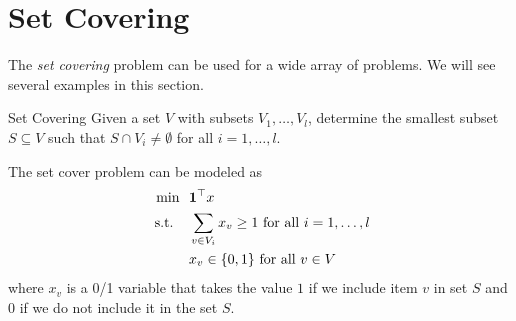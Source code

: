 \section{Set Covering}

The \emph{set covering} problem can be used for a wide array of problems.    We will see several examples in this section.

\begin{general}{Set Covering}{\npcomplete}
\label{general:set-covering}
Given a set $V$ with subsets $V_1, \dots, V_l$, determine the smallest subset $S \subseteq V$ such that 
$S \cap V_i \neq \emptyset$ for all $i=1, \dots, l$.

The set cover problem can be modeled as
\begin{equation}
\begin{split}
\min \ \ & \mathbf{1}^\top x\\
\text{ s.t. } \ \ & \sum_{v \in V_i} x_v \geq 1 \text{ for all } i =1, \dots, l \\ 
& x_v \in \{0,1\} \text{ for all } v \in V
\end{split}
\end{equation}
where $x_v$ is a 0/1 variable that takes the value $1$ if we include item $v$ in set $S$ and $0$ if we do not include it in the set $S$.  
\end{general}

